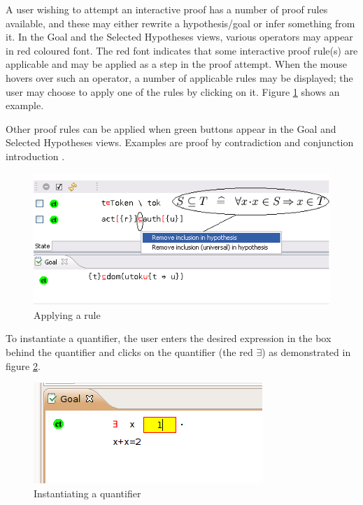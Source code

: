 A user wishing to attempt an interactive proof has a number of proof rules available, and these may either rewrite a hypothesis/goal or infer something from it. In the \textsf{Goal} and the \textsf{Selected Hypotheses} views, various operators may appear in red coloured font. The red font indicates that some interactive proof rule(s) are applicable and may be applied as a step in the proof attempt. When the mouse hovers over such an operator, a number of applicable rules may be displayed; the user may choose to apply one of the rules by clicking on it. Figure \ref{fig_ref_01_proving_perspective4} shows an example.

Other proof rules can be applied when green buttons appear in the \textsf{Goal} and \textsf{Selected Hypotheses} views. Examples are proof by contradiction  and conjunction introduction . 

\begin{figure}[!ht]
\begin{center}
	\includegraphics{img/reference/ref_01_proving_perspective4.png}
	\caption{Applying a rule}
	\label{fig_ref_01_proving_perspective4}
\end{center}
\end{figure}

To instantiate a quantifier, the user enters the desired expression in the box behind the quantifier and clicks on the quantifier (the red $\exists$) as demonstrated in figure \ref{fig_ref_01_proving_perspective5}.

\begin{figure}[!ht]
\begin{center}
	\includegraphics{img/reference/ref_01_proving_perspective5.png}
	\caption{Instantiating a quantifier}
	\label{fig_ref_01_proving_perspective5}
\end{center}
\end{figure}

